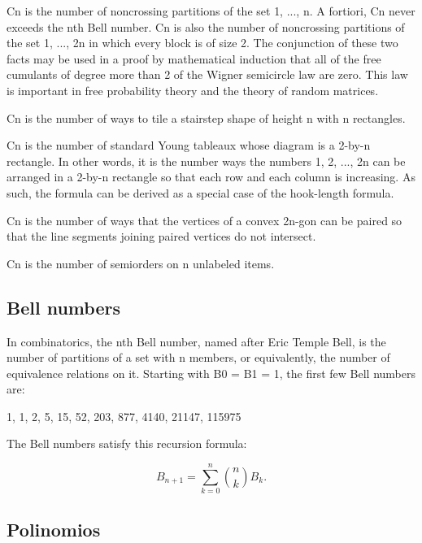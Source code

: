 \documentclass[10pt,letterpaper,twocolumn,twosided]{article}
\newcommand{\codigofuente}[1]{

\dotfill
}
\begin{document}
Cn is the number of noncrossing partitions of the set {1, ..., n}. A fortiori, Cn never exceeds the nth Bell number. Cn is also the number of noncrossing partitions of the set {1, ..., 2n} in which every block is of size 2. The conjunction of these two facts may be used in a proof by mathematical induction that all of the free cumulants of degree more than 2 of the Wigner semicircle law are zero. This law is important in free probability theory and the theory of random matrices.

Cn is the number of ways to tile a stairstep shape of height n with n rectangles.

Cn is the number of standard Young tableaux whose diagram is a 2-by-n rectangle. In other words, it is the number ways the numbers 1, 2, ..., 2n can be arranged in a 2-by-n rectangle so that each row and each column is increasing. As such, the formula can be derived as a special case of the hook-length formula.

Cn is the number of ways that the vertices of a convex 2n-gon can be paired so that the line segments joining paired vertices do not intersect.

Cn is the number of semiorders on n unlabeled items.

\subsection{Bell numbers}

In combinatorics, the nth Bell number, named after Eric Temple Bell, is the number of partitions of a set with n members, or equivalently, the number of equivalence relations on it. Starting with B0 = B1 = 1, the first few Bell numbers are:

1, 1, 2, 5, 15, 52, 203, 877, 4140, 21147, 115975

The Bell numbers satisfy this recursion formula:

$$B_{n+1}=\sum_{k=0}^{n}{{n \choose k}B_k}.$$

\subsection{Polinomios}

\codigofuente{src/misc/polynomials.cpp}
\end{document}
